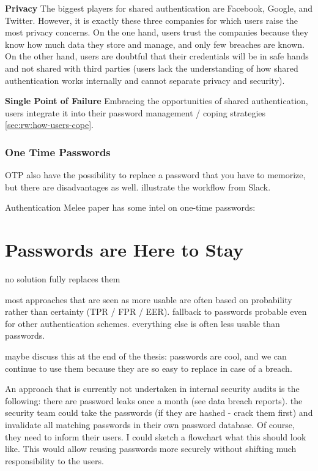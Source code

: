 \textbf{Privacy} The biggest players for shared authentication are Facebook, Google, and Twitter. However, it is exactly these three companies for which users raise the most privacy concerns. On the one hand, users trust the companies because they know how much data they store and manage, and only few breaches are known. On the other hand, users are doubtful that their credentials will be in safe hands and not shared with third parties (users lack the understanding of how shared authentication works internally and cannot separate privacy and security). 

\textbf{Single Point of Failure} Embracing the opportunities of shared authentication, users integrate it into their password management / coping strategies \ref{sec:rw:how-users-cope}. 

	
\subsubsection{One Time Passwords}

OTP also have the possibility to replace a password that you have to memorize, but there are disadvantages as well. 
illustrate the workflow from Slack.

Authentication Melee paper has some intel on one-time passwords: \cite{Ruoti2015AuthenticationMelee}


\section{Passwords are Here to Stay}
no solution fully replaces them

most approaches that are seen as more usable are often based on probability rather than certainty (TPR / FPR / EER). fallback to passwords probable even for other authentication schemes. everything else is often less usable than passwords. 

maybe discuss this at the end of the thesis: passwords are cool, and we can continue to use them because they are so easy to replace in case of a breach. 

An approach that is currently not undertaken in internal security audits is the following: there are password leaks once a month (see data breach reports). the security team could take the passwords (if they are hashed - crack them first) and invalidate all matching passwords in their own password database. Of course, they need to inform their users. I could sketch a flowchart what this should look like. This would allow reusing passwords more securely without shifting much responsibility to the users. 

